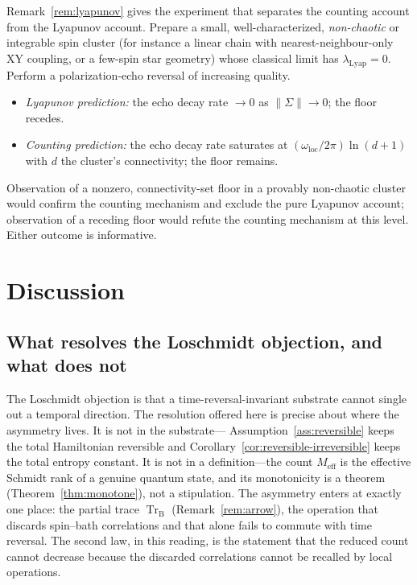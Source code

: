 \documentclass[twocolumn,10pt,a4paper]{article}
\theoremstyle{thmstyle}
\theoremstyle{definition}
\theoremstyle{remark}
\newcommand{\Tr}{\operatorname{Tr}}
\newcommand{\Meff}{M_{\mathrm{eff}}}
\begin{document}
Remark~\ref{rem:lyapunov} gives the experiment that separates the counting
account from the Lyapunov account. Prepare a small, well-characterized,
\emph{non-chaotic} or integrable spin cluster (for instance a linear chain
with nearest-neighbour-only XY coupling, or a few-spin star geometry) whose
classical limit has $\lambda_{\mathrm{Lyap}}=0$. Perform a polarization-echo
reversal of increasing quality.
\begin{itemize}[leftmargin=1.4em,itemsep=0.2em]
\item \emph{Lyapunov prediction:} the echo decay rate $\to 0$ as
$\|\Sigma\|\to 0$; the floor recedes.
\item \emph{Counting prediction:} the echo decay rate saturates at
$(\omega_{\mathrm{loc}}/2\pi)\ln(d+1)$ with $d$ the cluster's connectivity;
the floor remains.
\end{itemize}
Observation of a nonzero, connectivity-set floor in a provably non-chaotic
cluster would confirm the counting mechanism and exclude the pure Lyapunov
account; observation of a receding floor would refute the counting
mechanism at this level. Either outcome is informative.

\section{Discussion}
\label{sec:discussion}

\subsection{What resolves the Loschmidt objection, and what does not}

The Loschmidt objection is that a time-reversal-invariant substrate cannot
single out a temporal direction. The resolution offered here is precise
about where the asymmetry lives. It is not in the substrate---%
Assumption~\ref{ass:reversible} keeps the total Hamiltonian reversible and
Corollary~\ref{cor:reversible-irreversible} keeps the total entropy
constant. It is not in a definition---the count $\Meff$ is the effective
Schmidt rank of a genuine quantum state, and its monotonicity is a theorem
(Theorem~\ref{thm:monotone}), not a stipulation. The asymmetry enters at
exactly one place: the partial trace $\Tr_{\mathrm{B}}$
(Remark~\ref{rem:arrow}), the operation that discards spin--bath
correlations and that alone fails to commute with time reversal. The second
law, in this reading, is the statement that the reduced count cannot
decrease because the discarded correlations cannot be recalled by local
operations.
\end{document}
